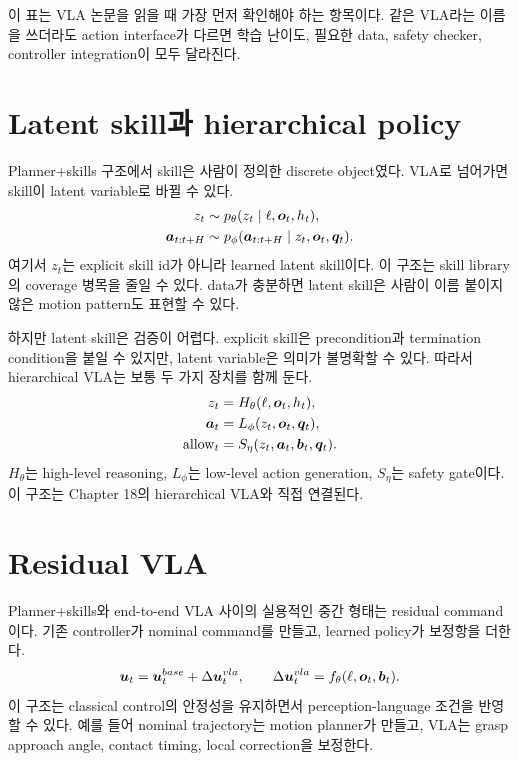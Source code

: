 이 표는 VLA 논문을 읽을 때 가장 먼저 확인해야 하는 항목이다. 같은 VLA라는 이름을 쓰더라도 action interface가 다르면 학습 난이도, 필요한 data, safety checker, controller integration이 모두 달라진다.

\section{Latent skill과 hierarchical policy}

Planner+skills 구조에서 skill은 사람이 정의한 discrete object였다. VLA로 넘어가면 skill이 latent variable로 바뀔 수 있다.
\begin{align}
  z_t &\sim p_{\theta}(z_t \mid \ell,\bm{o}_t,h_t), \\
  \bm{a}_{t:t+H} &\sim p_{\phi}(\bm{a}_{t:t+H} \mid z_t,\bm{o}_t,\bm{q}_t).
  \label{eq:latent-skill}
\end{align}
여기서 $z_t$는 explicit skill id가 아니라 learned latent skill이다. 이 구조는 skill library의 coverage 병목을 줄일 수 있다. data가 충분하면 latent skill은 사람이 이름 붙이지 않은 motion pattern도 표현할 수 있다.

하지만 latent skill은 검증이 어렵다. explicit skill은 precondition과 termination condition을 붙일 수 있지만, latent variable은 의미가 불명확할 수 있다. 따라서 hierarchical VLA는 보통 두 가지 장치를 함께 둔다.
\begin{equation}
  \begin{aligned}
  z_t &= H_{\theta}(\ell,\bm{o}_t,h_t), \\
  \bm{a}_t &= L_{\phi}(z_t,\bm{o}_t,\bm{q}_t), \\
  \mathrm{allow}_t &= S_{\eta}(z_t,\bm{a}_t,\bm{b}_t,\bm{q}_t).
  \end{aligned}
  \label{eq:hierarchical-vla-safety}
\end{equation}
$H_{\theta}$는 high-level reasoning, $L_{\phi}$는 low-level action generation, $S_{\eta}$는 safety gate이다. 이 구조는 Chapter 18의 hierarchical VLA와 직접 연결된다.

\section{Residual VLA}

Planner+skills와 end-to-end VLA 사이의 실용적인 중간 형태는 residual command이다. 기존 controller가 nominal command를 만들고, learned policy가 보정항을 더한다.
\begin{equation}
  \bm{u}_t
  =
  \bm{u}_t^{base}
  +
  \Delta \bm{u}_t^{vla},
  \qquad
  \Delta \bm{u}_t^{vla}
  =
  f_{\theta}(\ell,\bm{o}_t,\bm{b}_t).
  \label{eq:residual-vla}
\end{equation}
이 구조는 classical control의 안정성을 유지하면서 perception-language 조건을 반영할 수 있다. 예를 들어 nominal trajectory는 motion planner가 만들고, VLA는 grasp approach angle, contact timing, local correction을 보정한다.

